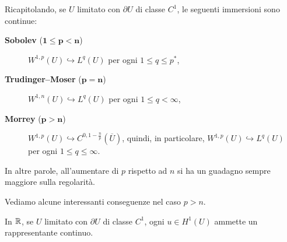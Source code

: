 Ricapitolando, se $U$ limitato con $\partial U$ di classe $C^1$, le seguenti immersioni sono continue:
\begin{description}
	\item[\textbf{Sobolev} ($\mathbf{1\le p< n}$)] $W^{1,p}(U) \hookrightarrow L^{q}(U)$ per ogni $1 \le q \le p^\ast$,
	\item[\textbf{Trudinger--Moser} ($\mathbf{p=n}$)] $W^{1,n}(U) \hookrightarrow L^{q}(U)$ per ogni $1 \le q < \infty$,
	\item[\textbf{Morrey} ($\mathbf{p > n}$)] $W^{1,p}(U) \hookrightarrow C^{0,1 - \frac{n}{p}}(\overline{U})$, quindi, in particolare, $W^{1,p}(U) \hookrightarrow L^{q}(U)$ per ogni $1 \le q \le \infty$.
\end{description}
In altre parole, all'aumentare di $p$ rispetto ad $n$ si ha un guadagno sempre maggiore sulla regolarità.

Vediamo alcune interessanti conseguenze nel caso $p>n$.
\begin{osservazione}
	In $\mathbb{R}$, se $U$ limitato con $\partial U$ di classe $C^1$, ogni $u \in H^1(U)$ ammette un rappresentante continuo.
\end{osservazione}

